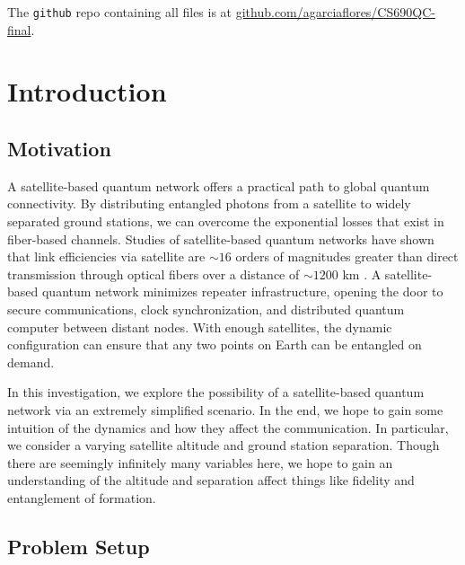 The \texttt{github} repo containing all files is at \href{https://github.com/agarciaflores/CS690QC-final}{github.com/agarciaflores/CS690QC-final}.

\chapter{Introduction}


\section{Motivation}

A satellite-based quantum network offers a practical path to global quantum connectivity. By distributing entangled photons from a satellite to widely separated ground stations, we can overcome the exponential losses that exist in fiber-based channels. Studies of satellite-based quantum networks have shown that link efficiencies via satellite are  $\sim16$ orders of magnitudes greater than direct transmission through optical fibers over a distance of $\sim1200$ km \cite{lu2022}. A satellite-based quantum network minimizes repeater infrastructure, opening the door to secure communications, clock synchronization, and distributed quantum computer between distant nodes. With enough satellites, the dynamic configuration can ensure that any two points on Earth can be entangled on demand.

In this investigation, we explore the possibility of a satellite-based quantum network via an extremely simplified scenario. In the end, we hope to gain some intuition of the dynamics and how they affect the communication. In particular, we consider a varying satellite altitude and ground station separation. Though there are seemingly infinitely many variables here, we hope to gain an understanding of the altitude and separation affect things like fidelity and entanglement of formation.


\section{Problem Setup}

